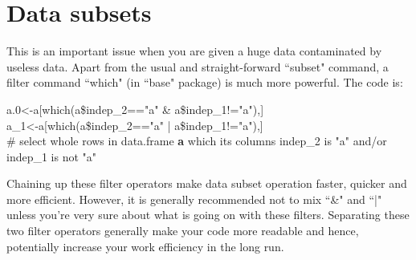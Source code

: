 \documentclass[../note.tex]{subfiles} %
\begin{document}
\section{Data subsets}
This is an important issue when you are given a huge data contaminated by useless data.  Apart from the usual and straight-forward ``subset" command, a filter command ``which" (in ``base" package\autocite{Rcore}) is much more powerful.  The code is:
\begin{code}
a.0<-a[which(a\$indep\_2=="a" \& a\$indep\_1!="a"),]\\
a\_1<-a[which(a\$indep\_2=="a" | a\$indep\_1!="a"),]\\
\# select whole rows in data.frame \textbf{a} which its columns indep\_2 is "a" and/or indep\_1 is not "a"
\end{code}
Chaining up these filter operators make data subset operation faster, quicker and more efficient.  However, it is generally recommended not to mix ``\&" and ``|" unless you're very sure about what is going on with these filters.  Separating these two filter operators generally make your code more readable and hence, potentially increase your work efficiency in the long run.
\end{document}

